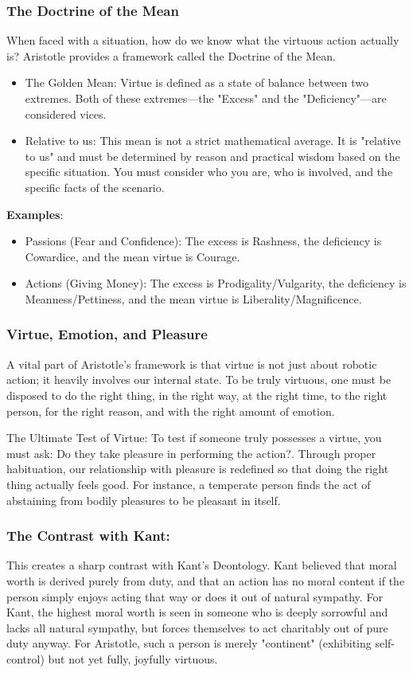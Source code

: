 \documentclass[12pt]{article}
\begin{document}
\subsubsection{The Doctrine of the Mean}
When faced with a situation, how do we know what the virtuous action actually is? Aristotle provides a framework called the Doctrine of the Mean.
\begin{itemize}
    \item The Golden Mean: Virtue is defined as a state of balance between two extremes. Both of these extremes—the "Excess" and the "Deficiency"—are considered vices.
    \item Relative to us: This mean is not a strict mathematical average. It is "relative to us" and must be determined by reason and practical wisdom based on the specific situation. You must consider who you are, who is involved, and the specific facts of the scenario.
\end{itemize}
\textbf{Examples}:
\begin{itemize}
    \item Passions (Fear and Confidence): The excess is Rashness, the deficiency is Cowardice, and the mean virtue is Courage.
    \item Actions (Giving Money): The excess is Prodigality/Vulgarity, the deficiency is Meanness/Pettiness, and the mean virtue is Liberality/Magnificence.
\end{itemize}

\subsubsection{Virtue, Emotion, and Pleasure}
A vital part of Aristotle's framework is that virtue is not just about robotic action; it heavily involves our internal state. To be truly virtuous, one must be disposed to do the right thing, in the right way, at the right time, to the right person, for the right reason, and with the right amount of emotion.

\smallskip
\noindent The Ultimate Test of Virtue: To test if someone truly possesses a virtue, you must ask: Do they take pleasure in performing the action?. Through proper habituation, our relationship with pleasure is redefined so that doing the right thing actually feels good. For instance, a temperate person finds the act of abstaining from bodily pleasures to be pleasant in itself.

\subsubsection{The Contrast with Kant:}
This creates a sharp contrast with Kant's Deontology. Kant believed that moral worth is derived purely from duty, and that an action has no moral content if the person simply enjoys acting that way or does it out of natural sympathy.
For Kant, the highest moral worth is seen in someone who is deeply sorrowful and lacks all natural sympathy, but forces themselves to act charitably out of pure duty anyway.
For Aristotle, such a person is merely "continent" (exhibiting self-control) but not yet fully, joyfully virtuous.
\end{document}
